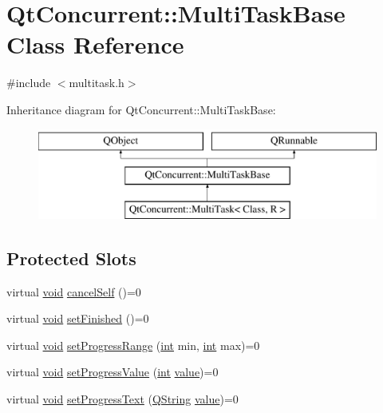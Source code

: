\hypertarget{class_qt_concurrent_1_1_multi_task_base}{\section{Qt\-Concurrent\-:\-:Multi\-Task\-Base Class Reference}
\label{class_qt_concurrent_1_1_multi_task_base}
}


{\ttfamily \#include $<$multitask.\-h$>$}

Inheritance diagram for Qt\-Concurrent\-:\-:Multi\-Task\-Base\-:\begin{figure}[H]
\begin{center}
\leavevmode
\includegraphics[height=3.000000cm]{class_qt_concurrent_1_1_multi_task_base}
\end{center}
\end{figure}
\subsection*{Protected Slots}
\begin{DoxyCompactItemize}
\item 
virtual \hyperlink{group___u_a_v_objects_plugin_ga444cf2ff3f0ecbe028adce838d373f5c}{void} \hyperlink{class_qt_concurrent_1_1_multi_task_base_a7a36b152012c4c8f1fdf9adedfc52872}{cancel\-Self} ()=0
\item 
virtual \hyperlink{group___u_a_v_objects_plugin_ga444cf2ff3f0ecbe028adce838d373f5c}{void} \hyperlink{class_qt_concurrent_1_1_multi_task_base_aa65148b44f23c1384db813a88ed13285}{set\-Finished} ()=0
\item 
virtual \hyperlink{group___u_a_v_objects_plugin_ga444cf2ff3f0ecbe028adce838d373f5c}{void} \hyperlink{class_qt_concurrent_1_1_multi_task_base_a3b5d534dc71c07fe833fdd7b0ad2fd90}{set\-Progress\-Range} (\hyperlink{ioapi_8h_a787fa3cf048117ba7123753c1e74fcd6}{int} min, \hyperlink{ioapi_8h_a787fa3cf048117ba7123753c1e74fcd6}{int} max)=0
\item 
virtual \hyperlink{group___u_a_v_objects_plugin_ga444cf2ff3f0ecbe028adce838d373f5c}{void} \hyperlink{class_qt_concurrent_1_1_multi_task_base_a8166aa2335d6adaba9e2895e23468a69}{set\-Progress\-Value} (\hyperlink{ioapi_8h_a787fa3cf048117ba7123753c1e74fcd6}{int} \hyperlink{glext_8h_aa0e2e9cea7f208d28acda0480144beb0}{value})=0
\item 
virtual \hyperlink{group___u_a_v_objects_plugin_ga444cf2ff3f0ecbe028adce838d373f5c}{void} \hyperlink{class_qt_concurrent_1_1_multi_task_base_a84581e7863640d10845ab80da959d024}{set\-Progress\-Text} (\hyperlink{group___u_a_v_objects_plugin_gab9d252f49c333c94a72f97ce3105a32d}{Q\-String} \hyperlink{glext_8h_aa0e2e9cea7f208d28acda0480144beb0}{value})=0
\end{DoxyCompactItemize}


